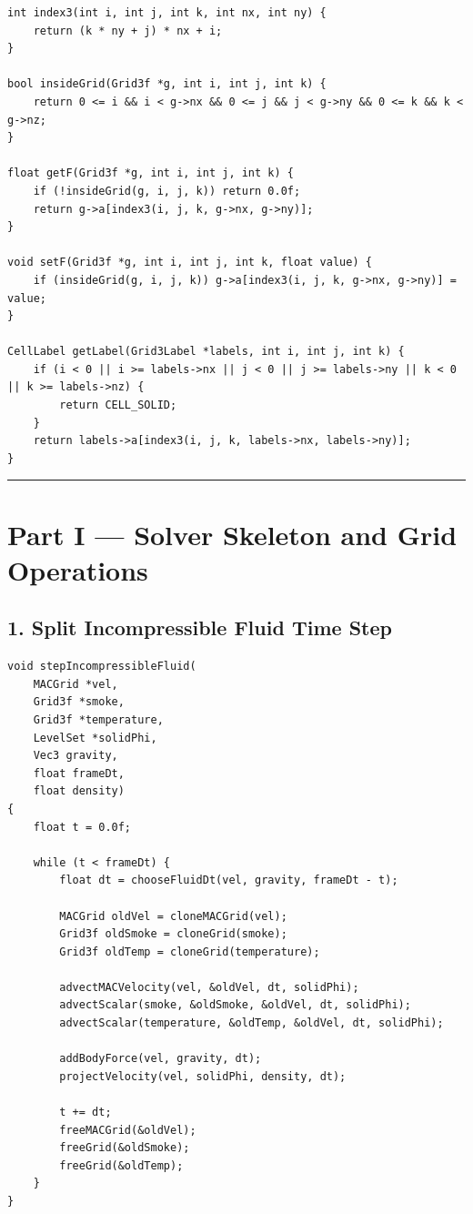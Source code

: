 \documentclass[10pt,letterpaper]{article}
\begin{document}
\begin{verbatim}
int index3(int i, int j, int k, int nx, int ny) {
    return (k * ny + j) * nx + i;
}

bool insideGrid(Grid3f *g, int i, int j, int k) {
    return 0 <= i && i < g->nx && 0 <= j && j < g->ny && 0 <= k && k < g->nz;
}

float getF(Grid3f *g, int i, int j, int k) {
    if (!insideGrid(g, i, j, k)) return 0.0f;
    return g->a[index3(i, j, k, g->nx, g->ny)];
}

void setF(Grid3f *g, int i, int j, int k, float value) {
    if (insideGrid(g, i, j, k)) g->a[index3(i, j, k, g->nx, g->ny)] = value;
}

CellLabel getLabel(Grid3Label *labels, int i, int j, int k) {
    if (i < 0 || i >= labels->nx || j < 0 || j >= labels->ny || k < 0 || k >= labels->nz) {
        return CELL_SOLID;
    }
    return labels->a[index3(i, j, k, labels->nx, labels->ny)];
}
\end{verbatim}

\medskip\hrule\medskip

\clearpage
{}
\section*{Part I --- Solver Skeleton and Grid Operations}

\subsection*{1. Split Incompressible Fluid Time Step}

\begin{verbatim}
void stepIncompressibleFluid(
    MACGrid *vel,
    Grid3f *smoke,
    Grid3f *temperature,
    LevelSet *solidPhi,
    Vec3 gravity,
    float frameDt,
    float density)
{
    float t = 0.0f;

    while (t < frameDt) {
        float dt = chooseFluidDt(vel, gravity, frameDt - t);

        MACGrid oldVel = cloneMACGrid(vel);
        Grid3f oldSmoke = cloneGrid(smoke);
        Grid3f oldTemp = cloneGrid(temperature);

        advectMACVelocity(vel, &oldVel, dt, solidPhi);
        advectScalar(smoke, &oldSmoke, &oldVel, dt, solidPhi);
        advectScalar(temperature, &oldTemp, &oldVel, dt, solidPhi);

        addBodyForce(vel, gravity, dt);
        projectVelocity(vel, solidPhi, density, dt);

        t += dt;
        freeMACGrid(&oldVel);
        freeGrid(&oldSmoke);
        freeGrid(&oldTemp);
    }
}
\end{verbatim}
\end{document}
